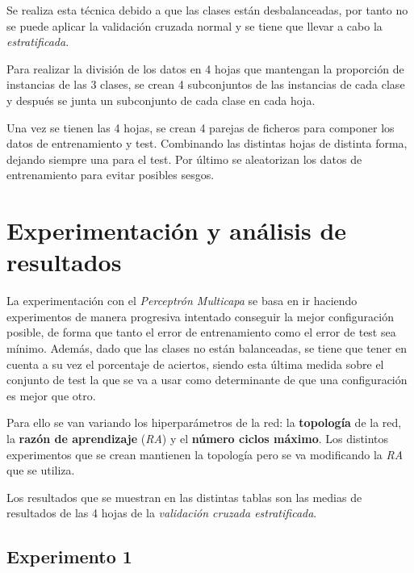 \documentclass{uc3mpracticas}
\begin{document}
Se realiza esta técnica debido a que las clases están desbalanceadas, por tanto no se puede aplicar la validación cruzada normal y se tiene que llevar a cabo la \textit{estratificada}.

\vspace{2mm}

Para realizar la división de los datos en 4 hojas que mantengan la proporción de instancias de las 3 clases, se crean 4 subconjuntos de las instancias de cada clase y después se junta un subconjunto de cada clase en cada hoja.

\vspace{2mm}

Una vez se tienen las 4 hojas, se crean 4 parejas de ficheros para componer los datos de entrenamiento y test. Combinando las distintas hojas de distinta forma, dejando siempre una para el test. Por último se aleatorizan los datos de entrenamiento para evitar posibles sesgos.



\section{Experimentación y análisis de resultados}

La experimentación con el \textit{Perceptrón Multicapa} se basa en ir haciendo experimentos de manera progresiva intentado conseguir la mejor configuración posible, de forma que tanto el error de entrenamiento como el error de test sea mínimo. Además, dado que las clases no están balanceadas, se tiene que tener en cuenta a su vez el porcentaje de aciertos, siendo esta última medida sobre el conjunto de test la que se va a usar como determinante de que una configuración es mejor que otro.

\vspace{2mm}

 Para ello se van variando los hiperparámetros de la red: la \textbf{topología} de la red, la \textbf{razón de aprendizaje} (\textit{RA}) y el \textbf{número ciclos máximo}. Los distintos experimentos que se crean mantienen la topología pero se va modificando la \textit{RA} que se utiliza.

\vspace{1mm}

Los resultados que se muestran en las distintas tablas son las medias de resultados de las 4 hojas de la \textit{validación cruzada estratificada}.

\subsection{Experimento 1}
\end{document}
